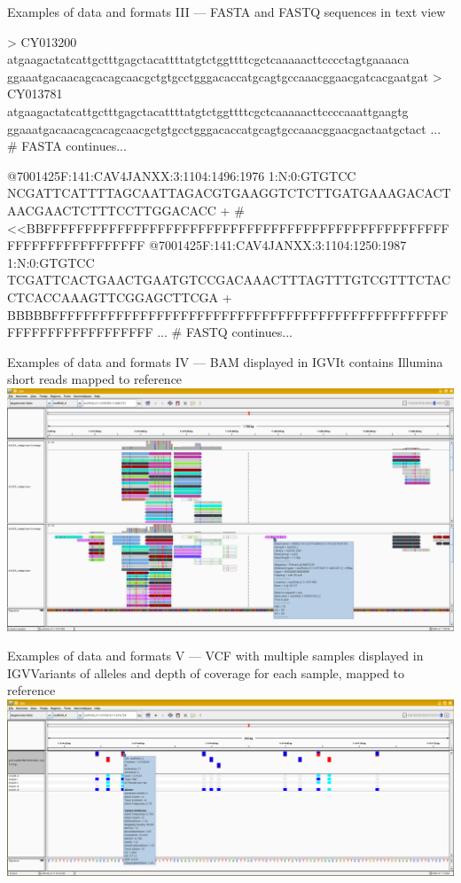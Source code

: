 \documentclass[compress, ucs, xelatex, 11pt, xcolor=svgnames,
	hyperref={
		bookmarks=true,
		unicode=true,
		colorlinks=true,
		pdftitle={Molecular data in R},
		plainpages=false,
		pdfauthor={Vojtech Zeisek},
		pdfsubject={Course about phylogeny and evolution in R},
		pdfcreator={XeLaTeX},
		pdfkeywords={R, evolution, phylogeny, molecular data},
		linkcolor=Tomato,
		anchorcolor=SaddleBrown,
		citecolor=Goldenrod,
		filecolor=DarkMagenta,
		menucolor=Sienna,
		urlcolor=DarkTurquoise,
		pdftex},
	url={hyphens, lowtilde} %
	]{beamer}
\begin{document}
\begin{frame}[fragile]{Examples of data and formats III --- FASTA and FASTQ sequences in text view}
	\begin{spluscode}
    > CY013200
    atgaagactatcattgctttgagctacattttatgtctggttttcgctcaaaaacttcccctagtgaaaaca
    ggaaatgacaacagcacagcaacgctgtgcctgggacaccatgcagtgccaaacggaacgatcacgaatgat
    > CY013781
    atgaagactatcattgctttgagctacattttatgtctggttttcgctcaaaaacttccccaaattgaagtg
    ggaaatgacaacagcacagcaacgctgtgcctgggacaccatgcagtgccaaacggaacgactaatgctact
    ... # FASTA continues...
	\end{spluscode}
	\vfill
	\begin{spluscode}
    @7001425F:141:CAV4JANXX:3:1104:1496:1976 1:N:0:GTGTCC
    NCGATTCATTTTAGCAATTAGACGTGAAGGTCTCTTGATGAAAGACACTAACGAACTCTTTCCTTGGACACC
    +
    #<<BBFFFFFFFFFFFFFFFFFFFFFFFFFFFFFFFFFFFFFFFFFFFFFFFFFFFFFFFFFFFFFFFFFFF
    @7001425F:141:CAV4JANXX:3:1104:1250:1987 1:N:0:GTGTCC
    TCGATTCACTGAACTGAATGTCCGACAAACTTTAGTTTGTCGTTTCTACCTCACCAAAGTTCGGAGCTTCGA
    +
    BBBBBFFFFFFFFFFFFFFFFFFFFFFFFFFFFFFFFFFFFFFFFFFFFFFFFFFFFFFFFFFFFFFFFFFF
    ... # FASTQ continues...
	\end{spluscode}
\end{frame}

\begin{frame}{Examples of data and formats IV --- BAM displayed in IGV}{It contains Illumina short reads mapped to reference}
	\includegraphics[width=\textwidth]{bam_igv.png}
\end{frame}

\begin{frame}{Examples of data and formats V --- VCF with multiple samples displayed in IGV}{Variants of alleles and depth of coverage for each sample, mapped to reference}
	\includegraphics[width=\textwidth]{vcf_igv.png}
\end{frame}
\end{document}

